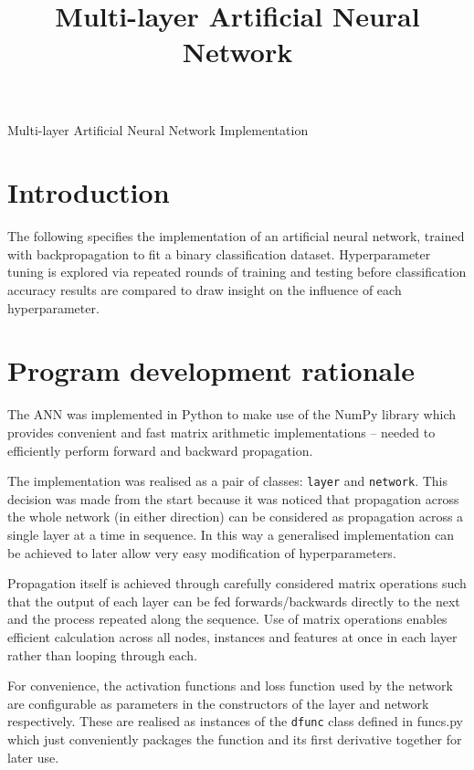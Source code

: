 \documentclass[12pt]{article}
\begin{document}
\title{Multi-layer Artificial Neural Network}

\begin{center}
  \Large{Multi-layer Artificial Neural Network Implementation}
\end{center}

\vspace{-2em}
\section{Introduction}
\vspace{-1.5em}

The following specifies the implementation of an artificial neural
network, trained with backpropagation to fit a binary classification
dataset. Hyperparameter tuning is explored via repeated rounds of
training and testing before classification accuracy results are compared
to draw insight on the influence of each hyperparameter.

\vspace{-1.5em}
\section{Program development rationale}
\vspace{-1.5em}

The ANN was implemented in Python to make use of the NumPy library which
provides convenient and fast matrix arithmetic implementations --
needed to efficiently perform forward and backward propagation.

The implementation was realised as a pair of classes: \texttt{layer}
and \texttt{network}. This decision was made from the start because
it was noticed that propagation across the whole network (in either
direction) can be considered as propagation across a single layer at a
time in sequence. In this way a generalised implementation can be
achieved to later allow very easy modification of hyperparameters.

Propagation itself is achieved through carefully considered matrix
operations such that the output of each layer can be fed
forwards/backwards directly to the next and the process repeated along
the sequence. Use of matrix operations enables efficient calculation
across all nodes, instances and features at once in each layer rather
than looping through each.

For convenience, the activation functions and loss function used by the
network are configurable as parameters in the constructors of the layer
and network respectively. These are realised as instances of the
\texttt{dfunc} class defined in funcs.py which just conveniently
packages the function and its first derivative together for later use.
\end{document}
